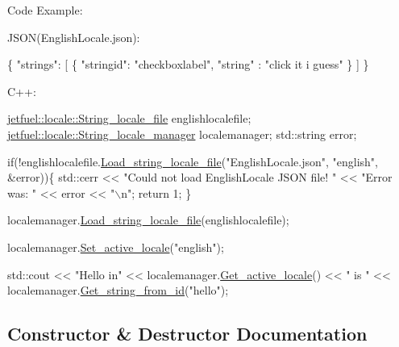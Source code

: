 Code Example\+:

J\+S\+ON(English\+Locale.\+json)\+:


\begin{DoxyCode}
\{
    \textcolor{stringliteral}{"strings"}: [
        \{
            \textcolor{stringliteral}{"stringid"}: \textcolor{stringliteral}{"checkboxlabel"},
            \textcolor{stringliteral}{"string"} : \textcolor{stringliteral}{"click it i guess"}
        \}
    ]
\}
\end{DoxyCode}


C++\+:


\begin{DoxyCode}
\hyperlink{classjetfuel_1_1locale_1_1String__locale__file}{jetfuel::locale::String\_locale\_file} englishlocalefile;
\hyperlink{classjetfuel_1_1locale_1_1String__locale__manager}{jetfuel::locale::String\_locale\_manager} localemanager;
std::string error;

\textcolor{keywordflow}{if}(!englishlocalefile.\hyperlink{classjetfuel_1_1locale_1_1String__locale__file_a904609e7cde4eb624cb940cbba642ea0}{Load\_string\_locale\_file}(\textcolor{stringliteral}{"EnglishLocale.json"},
    \textcolor{stringliteral}{"english"}, &error))\{
    std::cerr << \textcolor{stringliteral}{"Could not load EnglishLocale JSON file! "} <<
    \textcolor{stringliteral}{"Error was: "} << error << \textcolor{stringliteral}{"\(\backslash\)n"};
    \textcolor{keywordflow}{return} 1;
\}

localemanager.\hyperlink{classjetfuel_1_1locale_1_1String__locale__manager_a2a972352f2b52a6aec947aad636ca6f1}{Load\_string\_locale\_file}(englishlocalefile);

localemanager.\hyperlink{classjetfuel_1_1locale_1_1String__locale__manager_a2bca626efc214510e533a8c4ece7cafb}{Set\_active\_locale}(\textcolor{stringliteral}{"english"});

std::cout << \textcolor{stringliteral}{"Hello in"} << localemanager.\hyperlink{classjetfuel_1_1locale_1_1String__locale__manager_a41b25b50b804bce31184b32e6dc97fae}{Get\_active\_locale}() <<  
            \textcolor{stringliteral}{" is "} << localemanager.\hyperlink{classjetfuel_1_1locale_1_1String__locale__manager_a215fa1aaf302e45b1ab375f764a8d101}{Get\_string\_from\_id}(\textcolor{stringliteral}{"hello"});
\end{DoxyCode}
 

\subsection{Constructor \& Destructor Documentation}
\mbox{\label{classjetfuel_1_1locale_1_1String__locale__file_a98b4ccb05ae738101ec1c4af582aa0d8}} 
